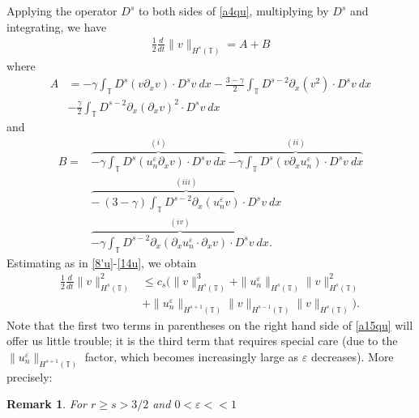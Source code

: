 \documentclass[12pt,reqno]{amsart}
\newcommand{\p}{\partial}
\newcommand{\ci}{\mathbb{T}}
\newcommand{\ee}{\varepsilon}
\theoremstyle{plain}  %
\newtheorem{remark}{Remark}
\theoremstyle{definition}
\begin{document}
\begin{appendices}
Applying the operator $D^s$ to both sides of \eqref{a4qu}, multiplying by
	$D^s$ and integrating, we have
	\begin{equation}
		\begin{split}
			\frac{1}{2}\frac{d}{dt} \|v\|_{H^s(\ci)} = A + B
			\label{a6qu}
		\end{split}
	\end{equation}
	where
	\begin{equation}
		\begin{split}
			A
			& =  -\gamma \int_{\ci} D^s(v \p_x v) \cdot D^s v \
			dx
			- \frac{3- \gamma}{2} \int_\ci D^{s-2} \p_x (v^2) \cdot D^s v
			\ dx
			\\
			& - \frac{\gamma}{2}\int_\ci D^{s-2} \p_x (\p_x v)^2 \cdot D^s
			v \ dx
			\label{a7qu}
		\end{split}
	\end{equation}
	and
	\begin{equation}
		\begin{split}
			B 
			 = &  \overbrace{-\gamma \int_\ci D^s (u^\ee_n \p_x v) \cdot D^s v \
			 dx}^{(i)}
			 \ \overbrace{-\gamma \int_\ci D^s (v \p_x u^\ee_n ) \cdot D^s v \
			 dx}^{(ii)}
			 \\
			  & \overbrace{- \ ( 3- \gamma) \int_\ci D^{s-2} \p_x (u^\ee_n v) \cdot D^s
			 v \ dx}^{(iii)}
			 \\
			 & \overbrace{-\gamma \int_\ci D^{s-2} \p_x
			(\p_x u^\ee_n \cdot \p_x v) \cdot D^s v \
			dx}^{(iv)}.
			\label{a8qu}
		\end{split}
	\end{equation}
	Estimating as in \eqref{8'u}-\eqref{14u}, we obtain
	\begin{equation}
		\begin{split}
			\frac{1}{2}\frac{d}{dt}\|v\|_{H^{s}(\ci)}^2
			& \le c_s(\|v\|_{H^s(\ci)}^3 + \|u^\ee_n\|_{H^s(\ci)}
			\|v\|_{H^s(\ci)}^2
			\\
			& + \|u^\ee_n\|_{H^{s+1}(\ci)}
			\|v\|_{H^{s-1}(\ci)} \|v\|_{H^s(\ci)}).
			\label{a15qu}
		\end{split}
	\end{equation}
	Note that the first two terms in parentheses on the right hand side
	of \eqref{a15qu} will offer us little trouble;
	it is the third term that requires special care (due to the
	$\|u^\ee_n\|_{H^{s+1}(\ci)}$ factor, which becomes increasingly large as
	$\ee$ decreases). More precisely:
	\begin{remark}
	\label{lem5r'}
	For $r \ge s > 3/2$ and $0 < \ee <<1$ 
	\begin{equation}

\end{equation}
\end{remark}
\end{appendices}
\end{document}
